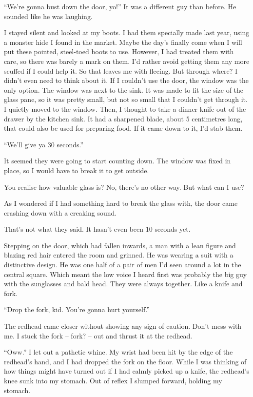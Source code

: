\documentclass[oneside]{book}
\begin{document}
“We’re gonna bust down the door, yo!” It was a different guy than before. He sounded like he was laughing.

I stayed silent and looked at my boots. I had them specially made last year, using a monster hide I found in the market. Maybe the day’s finally come when I will put these pointed, steel-toed boots to use. However, I had treated them with care, so there was barely a mark on them. I’d rather avoid getting them any more scuffed if I could help it. So that leaves me with fleeing. But through where? I didn’t even need to think about it. If I couldn’t use the door, the window was the only option. The window was next to the sink. It was made to fit the size of the glass pane, so it was pretty small, but not so small that I couldn’t get through it. I quietly moved to the window. Then, I thought to take a dinner knife out of the drawer by the kitchen sink. It had a sharpened blade, about 5 centimetres long, that could also be used for preparing food. If it came down to it, I’d stab them.

“We’ll give ya 30 seconds.”

It seemed they were going to start counting down. The window was fixed in place, so I would have to break it to get outside.

You realise how valuable glass is? No, there’s no other way. But what can I use?

As I wondered if I had something hard to break the glass with, the door came crashing down with a creaking sound.

That’s not what they said. It hasn’t even been 10 seconds yet.

Stepping on the door, which had fallen inwards, a man with a lean figure and blazing red hair entered the room and grinned. He was wearing a suit with a distinctive design. He was one half of a pair of men I’d seen around a lot in the central square. Which meant the low voice I heard first was probably the big guy with the sunglasses and bald head. They were always together. Like a knife and fork.

“Drop the fork, kid. You’re gonna hurt yourself.”

The redhead came closer without showing any sign of caution. Don’t mess with me. I stuck the fork – fork? – out and thrust it at the redhead.

“Oww.” I let out a pathetic whine. My wrist had been hit by the edge of the redhead’s hand, and I had dropped the fork on the floor. While I was thinking of how things might have turned out if I had calmly picked up a knife, the redhead’s knee sunk into my stomach. Out of reflex I slumped forward, holding my stomach.
\end{document}
